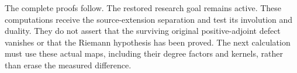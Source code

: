 The complete proofs follow. The restored research goal remains active.
These computations receive the source-extension separation and test its
involution and duality. They do not assert that the surviving original
positive-adjoint defect vanishes or that the Riemann hypothesis has been
proved. The next calculation must use these actual maps, including their
degree factors and kernels, rather than erase the measured difference.
